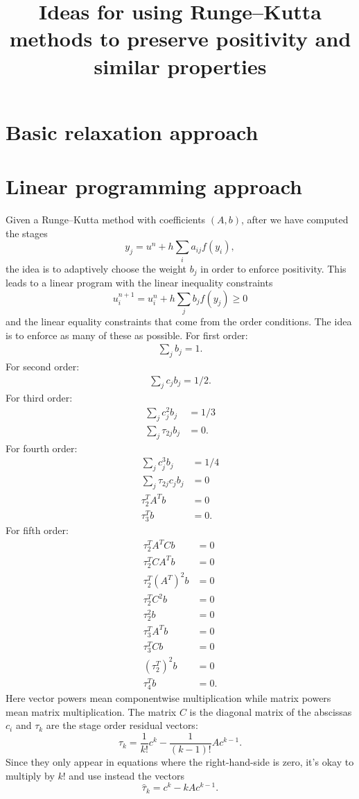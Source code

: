 \documentclass{article}
\title{Ideas for using Runge--Kutta methods to preserve positivity and similar properties}
\begin{document}
\maketitle

\section{Basic relaxation approach}

\section{Linear programming approach}
Given a Runge--Kutta method with coefficients $(A,b)$, after we have computed
the stages
$$
    y_j = u^n + h \sum_i a_{ij} f(y_i),
$$
the idea is to adaptively choose the weight $b_j$ in order to enforce positivity.
This leads to a linear program with the linear inequality constraints
$$
u^{n+1}_i = u^n_i + h \sum_j b_j f(y_j) \ge 0
$$
and the linear equality constraints that come from the order conditions.  The idea is
to enforce as many of these as possible.  For first order:
\begin{align}
\sum_j b_j = 1.
\end{align}
For second order:
\begin{align}
\sum_j c_j b_j = 1/2.
\end{align}
For third order:
\begin{align}
\sum_j c_j^2 b_j & = 1/3 \\
\sum_j \tau_{2j} b_j & = 0.
\end{align}
For fourth order:
\begin{align}
\sum_j c_j^3 b_j & = 1/4 \\
\sum_j \tau_{2j} c_j b_j & = 0 \\
\tau_{2}^T A^T b & = 0 \\
\tau_{3}^T b & = 0.
\end{align}
For fifth order:
\begin{align}
\tau_2^T A^T C b & = 0 \\
\tau_2^T C A^T b & = 0 \\
\tau_2^T (A^T)^2 b & = 0 \\
\tau_2^T C^2 b & = 0 \\
\tau_2^2 b & = 0 \\
\tau_3^T A^T b & = 0 \\
\tau_3^T C b & = 0 \\
(\tau_2^T)^2 b & = 0 \\
\tau_4^T b & = 0.
\end{align}
Here vector powers mean componentwise multiplication while
matrix powers mean matrix multiplication.  The matrix $C$ is the
diagonal matrix of the abscissas $c_i$ and
$\tau_k$ are the stage order residual vectors:
$$
    \tau_k = \frac{1}{k!} c^k - \frac{1}{(k-1)!}Ac^{k-1}.
$$
Since they only appear in equations where the right-hand-side is zero,
it's okay to multiply by $k!$ and use instead the vectors
$$
    \hat{\tau}_k = c^k - kAc^{k-1}.
$$
\end{document}
